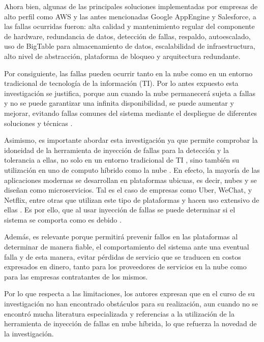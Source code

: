 \par Ahora bien, algunas de las principales soluciones implementadas por  empresas de alto perfil como AWS y las antes mencionadas  Google AppEngine y Salesforce, a las  fallas ocurridas fueron: alta calidad y mantenimiento regular del componente de hardware, redundancia de datos, detección de fallas, respaldo, autoescalado, uso de BigTable para almacenamiento de datos, escalabilidad de infraestructura, alto nivel de abstracción, plataforma de bloqueo y arquitectura redundante.\\

\par Por consiguiente, las fallas pueden ocurrir tanto en la nube como en un entorno tradicional de tecnología de la información (TI). Por lo antes expuesto esta investigación se justifica, porque aun cuando la nube permanecerá sujeta a fallas y no se puede garantizar una infinita disponibilidad, se puede aumentar y mejorar, evitando fallas comunes del sistema mediante el despliegue de diferentes soluciones  y técnicas \cite{PLAN09}.\\

\par Asimismo, es importante abordar esta investigación ya que permite comprobar la idoneidad  de la herramienta de inyección de fallas para la detección  y la tolerancia a ellas, no solo en un entorno tradicional de TI \cite{LIB01}, sino también su utilización en uno de computo  híbrido como la nube \cite{PLAN08,PLAN12} . En efecto, la mayoría de las aplicaciones modernas  se desarrollan en plataformas ubicuas, es decir, nubes y se diseñan como microservicios. Tal es el caso de empresas como Uber, WeChat, y Netflix, entre otras que  utilizan este tipo de plataformas y hacen uso extensivo de ellas . Es por ello, que al usar inyección de fallas se puede determinar si el sistema se comporta como es debido \cite{LIB12}.\\

\par  Además, es relevante porque permitirá  prevenir fallos en las plataformas al determinar de manera fiable, el comportamiento del sistema ante una eventual falla  y de esta manera, evitar pérdidas de servicio que se traducen en costos expresados en dinero, tanto para los proveedores de servicios en la nube como para las empresas contratantes de los mismos.\\

\par Por lo que respecta a las limitaciones, los autores expresan que en el curso de su investigación no han encontrado obstáculos para su realización, aun cuando  no se encontró mucha literatura especializada y referencias a la utilización de la herramienta de inyección de fallas en nube híbrida, lo que refuerza la novedad de la investigación.\\




